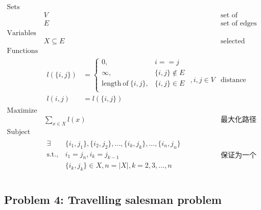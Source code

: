 \documentclass[11pt]{article}
\begin{document}
\begin{eqnarray*}
    \textrm{Sets} \\
        & V & \textrm{set of vertices} \\
        & E & \textrm{set of edges} \\
    \textrm{Variables} \\
        & X \subseteq E & \textrm{selected edges} \\
    \textrm{Functions} \\
        & \begin{array}{rl}
            l(\{i, j\}) &= \left\{
                \begin{array}{ll}
                    0,                              & i == j \\
                    \infty,                         & \{i, j\} \notin E \\
                    \mathrm{length\ of\ }\{i, j\},  & \{i, j\} \in E \\
                \end{array}
            \right. \\
            l(i, j) &= l(\{i, j\})
        \end{array}, i, j \in V & \textrm{distance between vertices} \\
    \textrm{Maximize} \\
        & \displaystyle \sum_{x \in X} l(x) & \textrm{最大化路径长度} \\
    \textrm{Subject to} \\
        & \begin{array}{rl}
            \exists & \{i_1, j_1\}, \{i_2, j_2\}, ..., \{i_k, j_k\}, ..., \{i_n, j_n\} \\
            \mathrm{s.t.,} & i_1 = j_n, i_k = j_{k-1} \\
                    & \{i_k, j_k\} \in X, n = |X|, k = 2, 3, ..., n
        \end{array} & \textrm{保证为一个环} \\ 
\end{eqnarray*}


\newpage
\subsection*{Problem 4: Travelling salesman problem}
\end{document}
